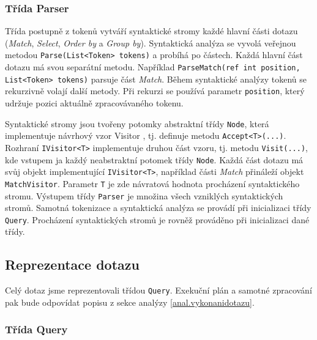 \subsubsection{Třída Parser}

Třída postupně z tokenů vytváří syntaktické stromy každé hlavní části dotazu (\textit{Match}, \textit{Select}, \textit{Order by} a \textit{Group by}).
Syntaktická analýza se vyvolá veřejnou metodou \texttt{Parse(List<Token> tokens)} a probíhá po částech.
Každá hlavní část dotazu má svou separátní metodu.
Například \texttt{ParseMatch(ref int position, List<Token> tokens)} parsuje část \textit{Match}. 
Během syntaktické analýzy tokenů se rekurzivně volají další metody.
Při rekurzi se používá parametr \texttt{position}, který udržuje pozici aktuálně zpracovávaného tokenu.

Syntaktické stromy jsou tvořeny potomky abstraktní třídy \texttt{Node}, která implementuje návrhový vzor Visitor \citep[str. 331]{patterns}, tj. definuje metodu \texttt{Accept<T>(...)}.
Rozhraní \texttt{IVisitor<T>} implementuje druhou část vzoru, tj. metodu \texttt{Visit(...)}, kde vstupem ja každý neabstraktní potomek třídy \texttt{Node}.
Každá část dotazu má svůj objekt implementující \texttt{IVisitor<T>}, například části \textit{Match} přináleží objekt \texttt{MatchVisitor}.
Parametr \texttt{T} je zde návratová hodnota procházení syntaktického stromu.
Výstupem třídy \texttt{Parser} je množina všech vzniklých syntaktických stromů.
Samotná tokenizace a syntaktická analýza se provádí při inicializaci třídy \texttt{Query}.
Procházení syntaktických stromů je rovněž prováděno při inicializaci dané třídy.

\subsection{Reprezentace dotazu}
Celý dotaz jsme reprezentovali třídou \texttt{Query}.
Exekuční plán a samotné zpracování pak bude odpovídat popisu z sekce analýzy \ref{anal.vykonanidotazu}.

\subsubsection{Třída Query}

